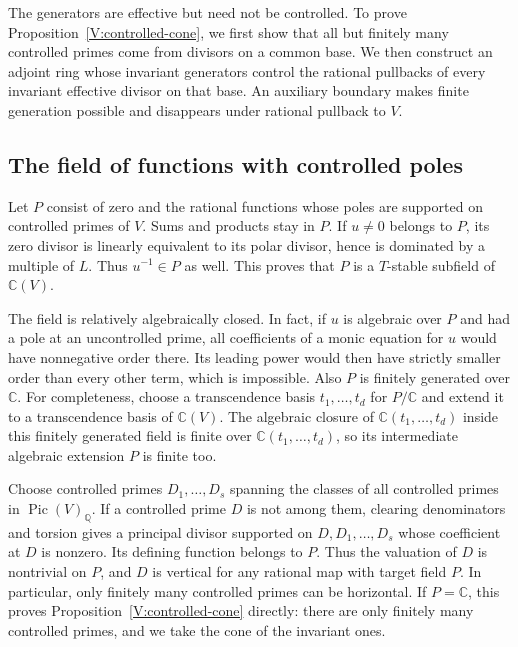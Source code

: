The generators are effective but need not be controlled.  To prove
Proposition~\ref{V:controlled-cone}, we first show that all but finitely
many controlled primes come from divisors on a common base.  We then
construct an adjoint ring whose invariant generators control the
rational pullbacks of every invariant effective divisor on that base.
An auxiliary boundary makes finite generation possible and disappears
under rational pullback to $V$.

\subsection{The field of functions with controlled poles}

Let $P$ consist of zero and the rational functions whose poles are
supported on controlled primes of $V$.  Sums and products stay in $P$.
If $u\ne0$ belongs to $P$, its zero divisor is linearly equivalent to
its polar divisor, hence is dominated by a multiple of $L$.  Thus
$u^{-1}\in P$ as well.  This proves that $P$ is a $T$-stable subfield
of $\mathbb C(V)$.

The field is relatively algebraically closed.  In fact, if $u$ is
algebraic over $P$ and had a pole at an uncontrolled prime, all
coefficients of a monic equation for $u$ would have nonnegative order
there.  Its leading power would then have strictly smaller order than
every other term, which is impossible.  Also $P$ is finitely generated
over $\mathbb C$.  For completeness, choose a transcendence basis
$t_1,\ldots,t_d$ for $P/\mathbb C$ and extend it to a transcendence
basis of $\mathbb C(V)$.  The algebraic closure of
$\mathbb C(t_1,\ldots,t_d)$ inside this finitely generated field is
finite over $\mathbb C(t_1,\ldots,t_d)$, so its intermediate algebraic
extension $P$ is finite too.

Choose controlled primes $D_1,\ldots,D_s$ spanning the classes of
all controlled primes in $\operatorname{Pic}(V)_{\mathbb Q}$.  If a
controlled prime $D$ is not among them, clearing denominators and
torsion gives a principal divisor supported on $D,D_1,\ldots,D_s$
whose coefficient at $D$ is nonzero.  Its defining function belongs to
$P$.  Thus the valuation of $D$ is nontrivial on $P$, and $D$ is
vertical for any rational map with target field $P$.  In particular,
only finitely many controlled primes can be horizontal.  If
$P=\mathbb C$, this proves Proposition~\ref{V:controlled-cone} directly:
there are only finitely many controlled primes, and we take the cone of
the invariant ones.

